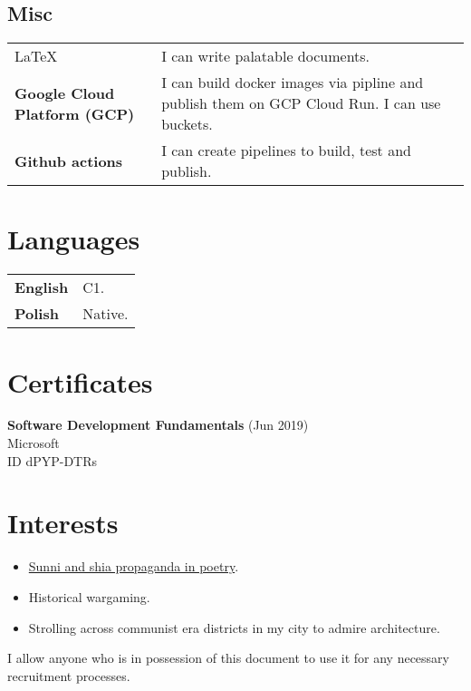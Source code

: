 \documentclass[10pt]{article}
\begin{document}
\subsection{Misc}
\begin{table}[H]
        \begin{tabularx}{\textwidth}{@{}l X}
         \LaTeX & I can write palatable documents. \\
          \textbf{Google Cloud Platform (GCP)} & I can build docker images via pipline and publish them on GCP Cloud Run. I can use buckets.  \\
           \textbf{Github actions} & I can create pipelines to build, test and publish.  \\
\end{tabularx}
\end{table}
\section{Languages}
\begin{table}[H]
        \begin{tabularx}{\textwidth}{@{}l X}
         \bfseries English & C1. \\
         \bfseries Polish & Native.  \\
\end{tabularx}
\end{table}
\section{Certificates}
\Large \textbf{Software Development Fundamentals} (Jun 2019) \vspace{0.3em}\\
\large Microsoft \vspace{0.5em} \\
\small ID dPYP-DTRs \\
\section{Interests}
\begin{itemize}
    \item \href{http://cejsh.icm.edu.pl/cejsh/element/bwmeta1.element.desklight-b5b6fec4-8161-42ac-9a31-c0e6c344f9fa}{Sunni and shia propaganda in poetry}.
    \item Historical wargaming.
    \item Strolling across communist era districts in my city to admire architecture.
\end{itemize}
\vfill
\begin{center}
I allow anyone who is in possession of this document to use it for any necessary recruitment processes.
\end{center}
\end{document}

